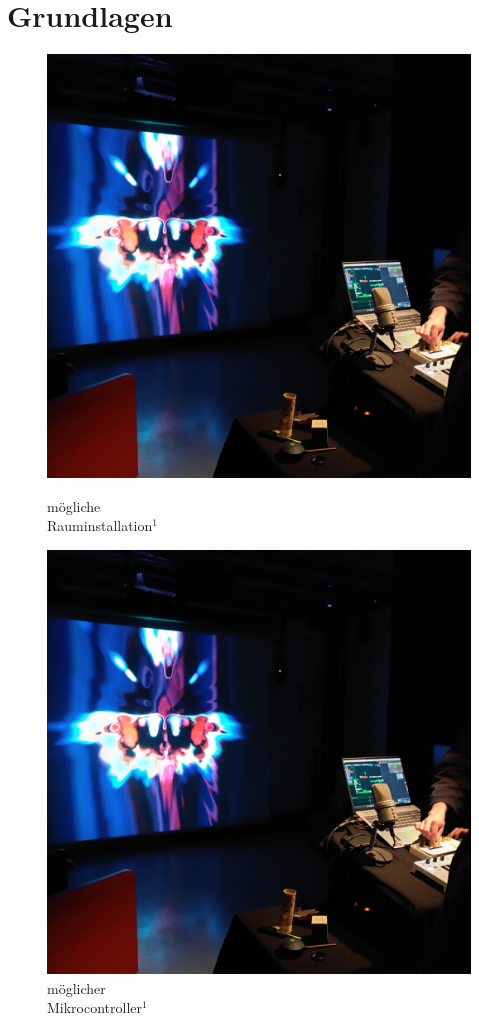 \documentclass[12pt]{scrartcl}%
\theoremstyle{nonumberplain}
\begin{document}
\section{Grundlagen}
\begin{figure}[h]
   \begin{minipage}[b]{.4\linewidth}
      \includegraphics[width=\linewidth]{Rauminstallation}
      \caption{mögliche\\Rauminstallation${}^{1}$}
   \end{minipage}
   \hspace{.1\linewidth}
   \begin{minipage}[b]{.4\linewidth}
      \includegraphics[width=\linewidth]{Rauminstallation}
      \caption{möglicher\\Mikrocontroller${}^{1}$}
   \end{minipage}
\end{figure}
\end{document}
